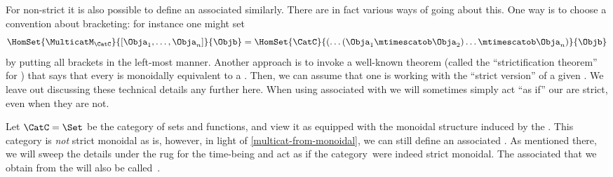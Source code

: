 
\begin{remark}
    \label{multicat-from-monoidal}
    For non-strict  it is also possible to define an associated  similarly.
    There are in fact various ways of going about this.
    One way is to choose a convention about bracketing: for instance one might set
    \begin{equation}
        \HomSet{\MulticatM_\CatC}{[\Obja_1,\ldots,\Obja_n]}{\Objb}=\HomSet{\CatC}{ ( \dots (\Obja_1 \mtimescatob \Obja_2) \ldots \mtimescatob \Obja_n)}{\Objb}
    \end{equation}
    by putting all brackets in the left-most manner.
    Another approach is to invoke a well-known theorem (called the ``strictification theorem'' for ) that says that every  is monoidally equivalent to a .
    Then, we can assume that one is working with the ``strict version'' of a given .
    We leave out discussing these technical details any further here.
    When using  associated with  we will sometimes simply act ``as if'' our  are strict, even when they are not.
\end{remark}

\begin{example}
    Let $\CatC = \Set$ be the category of sets and functions, and view it as equipped with the monoidal structure induced by the .
    This category is \emph{not} strict monoidal as is, however, in light of \cref{multicat-from-monoidal}, we can still define an associated .
    As mentioned there, we will sweep the details under the rug for the time-being and act as if the category~\Set were indeed strict monoidal.
    The associated  that we obtain from the  \Set will also be called~\Set.
\end{example}

